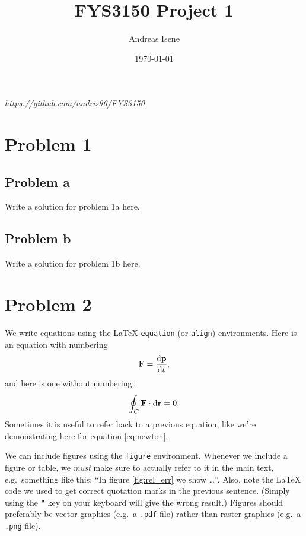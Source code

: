\documentclass[english,notitlepage]{revtex4-1}  %
\begin{document}
	
	\title{FYS3150 Project 1}      %
	\author{Andreas Isene}          %
	\date{\today}                             %
	\noaffiliation                            %
	
	
	\maketitle 
	
	\textit{https://github.com/andris96/FYS3150}
	
	\section*{Problem 1}
	
	\subsection*{Problem a}
	Write a solution for problem 1a here.
	
	\subsection*{Problem b}
	Write a solution for problem 1b here.
	
	\section*{Problem 2}
	We write equations using the LaTeX \texttt{equation} (or \texttt{align}) environments. Here is an equation with numbering
	\begin{equation}\label{eq:newton}
		\vb{F} = \dv{\vb{p}}{t},
	\end{equation}
	and here is one without numbering:
	\begin{equation*}
		\oint_C \vb{F}\cdot \dd \vb{r} = 0.
	\end{equation*}
	Sometimes it is useful to refer back to a previous equation, like we're demonstrating here for equation \ref{eq:newton}.
	
	We can include figures using the \texttt{figure} environment. Whenever we include a figure or table, we \textit{must} make sure to actually refer to it in the main text, e.g.\ something like this: ``In figure \ref{fig:rel_err} we show \ldots''. 
	Also, note the LaTeX code we used to get correct quotation marks in the previous sentence. (Simply using the \texttt{"} key on your keyboard will give the wrong result.) Figures should preferably be vector graphics (e.g.\ a \texttt{.pdf} file) rather than raster graphics (e.g.\ a \texttt{.png} file).
	
\end{document}

